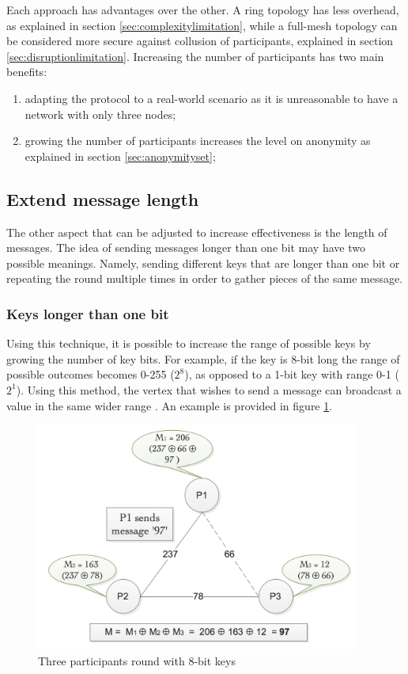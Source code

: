 Each approach has advantages over the other. A ring topology has less overhead, as explained in section \ref{sec:complexitylimitation}, while a full-mesh topology can be considered more secure against collusion of participants, explained in section \ref{sec:disruptionlimitation}.
Increasing the number of participants has two main benefits:
\begin{enumerate}
    \item adapting the protocol to a real-world scenario as it is unreasonable to have a network with only three nodes;
    \item growing the number of participants increases the level on anonymity as explained in section \ref{sec:anonymityset}; \newline \newline
\end{enumerate} 

\subsection{Extend message length}
The other aspect that can be adjusted to increase effectiveness is the length of messages. The idea of sending messages longer than one bit may have two possible meanings. Namely, sending different keys that are longer than one bit or repeating the round multiple times in order to gather pieces of the same message.

\subsubsection{Keys longer than one bit} \label{sec:longerKeys}
Using this technique, it is possible to increase the range of possible keys by growing the number of key bits. For example, if the key is 8-bit long the range of possible outcomes becomes 0-255 ($2^8$), as opposed to a 1-bit key with range 0-1 ($2^1$). Using this method, the vertex that wishes to send a message can broadcast a value in the same wider range \cite{Scholz}. An example is provided in figure \ref{fig:xorlongkeys}.

\begin{figure}[h!]
    \centering
    \includegraphics[width=0.95\textwidth]{Images/dcnet8bitkeys.png}
    \caption{Three participants round with 8-bit keys}
    \label{fig:xorlongkeys}
\end{figure}

